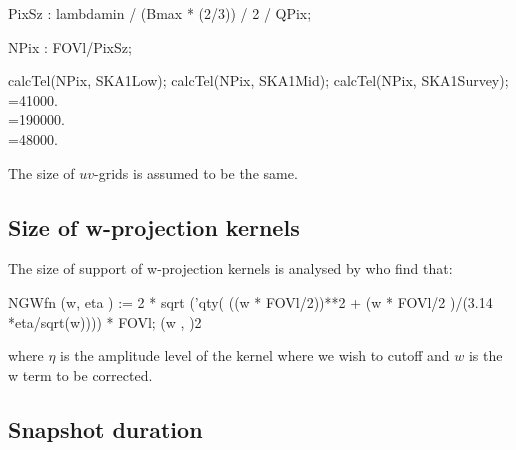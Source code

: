 \documentclass[useAMS,usenatbib,referee]{article}
\begin{document}
\begin{maxima}[]
PixSz : lambdamin / (Bmax * (2/3)) / 2 / QPix;
\maximaoutput*
{} \\
\end{maxima}

\begin{maxima}[]
NPix : FOVl/PixSz; 

calcTel(NPix, SKA1Low);
calcTel(NPix, SKA1Mid);
calcTel(NPix, SKA1Survey);
\maximaoutput*
{} \\
\m  {}=41000. \\
\m  {}=190000. \\
\m  {}=48000. \\
\end{maxima}

The size of $uv$-grids is assumed to be the same. 

\subsection{Size of w-projection kernels}

The size of support of w-projection kernels is analysed by
\cite{Mitchell2014} who find that:
\begin{maxima}[]
NGWfn (w, eta )  := 2 * sqrt ('qty( ((w * FOVl/2))**2 + (w * FOVl/2 )/(3.14 *eta/sqrt(w))))  * FOVl;
\maximaoutput*
\m  {}\left(w , \eta\right)\mathbin{:=}2\,\, \\
\end{maxima}
where $\eta$ is the amplitude level of the kernel where we wish to
cutoff and $w$ is the w term to be corrected. 

\subsection{Snapshot duration}
\end{document}
